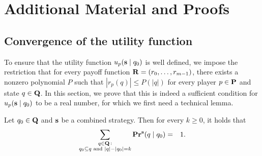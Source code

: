
\newcommand{\pol}{\text{\it P}}

\section{Additional Material and Proofs}
\label{sec-appendix}

\subsection{Convergence of the utility function}
\label{sec-conver}

To ensure that the utility function $u_p(\mathbf{s} \mid q_0)$ is well defined, we impose the restriction that for every payoff function $\mathbf{R} = (r_0, \ldots, r_{m-1})$, there exists a nonzero polynomial $P$ such that $|r_p(q)| \leq P(|q|)$ for every player $p \in \mathbf{P}$ and state $q \in \mathbf{Q}$. In this section, we prove that this is indeed a sufficient condition for $u_p(\mathbf{s} \mid q_0)$ to be a real number, for which we first need a technical lemma. 

\begin{mylem}\label{lem-prop-k}
Let $q_0 \in \mathbf{Q}$ and $\mathbf{s}$ be a combined strategy. Then for every $k \geq 0$, it holds that
\begin{eqnarray*}
\sum_{\substack{q \in \mathbf{Q} \,: \\ q_0 \subseteq q \text{ {\rm and} } |q| - |q_0| = k}} \mathbf{Pr}^{\mathbf{s}}(q \mid q_0) & = & 1.
\end{eqnarray*}
\end{mylem}

